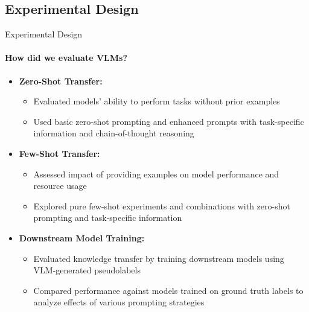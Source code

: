 \subsection{Experimental Design}
\begin{frame}{Experimental Design}
\framesubtitle{How did we evaluate VLMs?}
  \vspace{-1em}
  \begin{itemize}
    \item \textbf{Zero-Shot Transfer:}
    \begin{itemize}
      \item Evaluated models' ability to perform tasks without prior examples
      \item Used basic zero-shot prompting and enhanced prompts with task-specific information and chain-of-thought reasoning
    \end{itemize}
    \item \textbf{Few-Shot Transfer:}
    \begin{itemize}
      \item Assessed impact of providing examples on model performance and resource usage
      \item Explored pure few-shot experiments and combinations with zero-shot prompting and task-specific information
    \end{itemize}
    \item \textbf{Downstream Model Training:}
    \begin{itemize}
      \item Evaluated knowledge transfer by training downstream models using VLM-generated pseudolabels
      \item Compared performance against models trained on ground truth labels to analyze effects of various prompting strategies
    \end{itemize}
  \end{itemize}
\end{frame}


